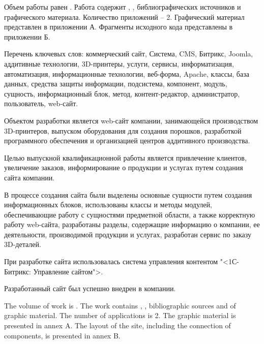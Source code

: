 
Объем работы равен . Работа содержит , ,  библиографических источников и  графического материала. Количество приложений – 2. Графический материал представлен в приложении А. Фрагменты исходного кода представлены в приложении Б.

Перечень ключевых слов: коммерческий сайт, Система, CMS, Битрикс, Joomla, аддитивные технологии, 3D-принтеры, услуги, сервисы, информатизация, автоматизация, информационные технологии, веб-форма,  Apache, классы, база данных, средства защиты информации, подсистема, компонент, модуль, сущность, информационный блок, метод, контент-редактор, администратор, пользователь, web-сайт.

Объектом разработки является web-сайт компании,  занимающейся производством 3D-принтеров, выпуском оборудования для создания порошков, разработкой программного обеспечения и организацией центров аддитивного производства.

Целью выпускной квалификационной работы является привлечение клиентов, увеличение заказов, информирование о продукции и услугах путем создания сайта компании.

В процессе создания сайта были выделены основные сущности путем создания информационных блоков, использованы классы и методы модулей, обеспечивающие работу с сущностями предметной области, а также корректную работу web-сайта, разработаны разделы, содержащие информацию о компании, ее деятельности, производимой продукции и услугах, разработан сервис по заказу 3D-деталей.

При разработке сайта использовалась система управления контентом "<1С-Битрикс: Управление сайтом">.

Разработанный сайт был успешно внедрен в компании.

  
The volume of work is . The work contains , ,  bibliographic sources and  of graphic material. The number of applications is 2. The graphic material is presented in annex A. The layout of the site, including the connection of components, is presented in annex B.

